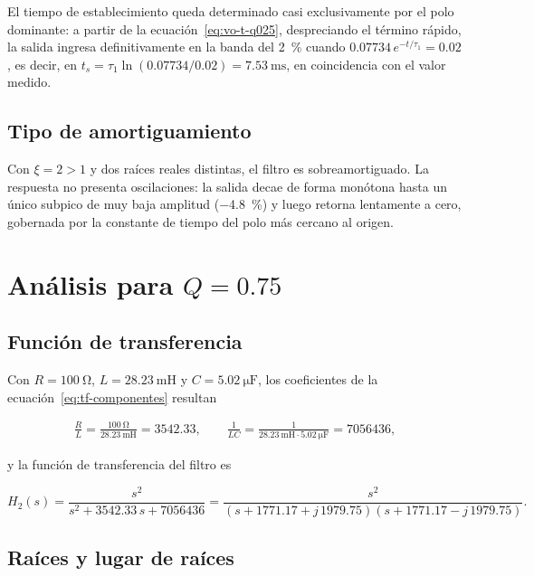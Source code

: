 El tiempo de establecimiento queda determinado casi exclusivamente por el polo dominante: a partir de la
ecuación~\eqref{eq:vo-t-q025}, despreciando el término rápido, la salida ingresa definitivamente en la
banda del \qty{2}{\percent} cuando $\num{0.07734}\, e^{-t/\tau_1} = \num{0.02}$, es decir, en
$t_s = \tau_1 \ln\left(\num{0.07734}/\num{0.02}\right) = \qty{7.53}{\milli\second}$, en coincidencia con el
valor medido.

\subsection{Tipo de amortiguamiento}

Con $\xi = 2 > 1$ y dos raíces reales distintas, el filtro es sobreamortiguado. La respuesta no presenta
oscilaciones: la salida decae de forma monótona hasta un único subpico de muy baja amplitud
(\qty{-4.8}{\percent}) y luego retorna lentamente a cero, gobernada por la constante de tiempo del polo
más cercano al origen.

\section{Análisis para $Q = \num{0.75}$}

\subsection{Función de transferencia}

Con $R = \qty{100}{\ohm}$, $L = \qty{28.23}{\milli\henry}$ y $C = \qty{5.02}{\micro\farad}$, los
coeficientes de la ecuación~\eqref{eq:tf-componentes} resultan

\begin{gather*}
  \frac{R}{L} = \frac{\qty{100}{\ohm}}{\qty{28.23}{\milli\henry}} = \num{3542.33}, \qquad
  \frac{1}{LC} = \frac{1}{\qty{28.23}{\milli\henry} \cdot \qty{5.02}{\micro\farad}} = \num{7056436},
\end{gather*}

y la función de transferencia del filtro es

\begin{equation}
  H_2(s) = \frac{s^2}{s^2 + \num{3542.33}\, s + \num{7056436}}
         = \frac{s^2}{\left(s + \num{1771.17} + j\,\num{1979.75}\right)
                       \left(s + \num{1771.17} - j\,\num{1979.75}\right)}.
  \label{eq:tf-q075}
\end{equation}

\subsection{Raíces y lugar de raíces}

